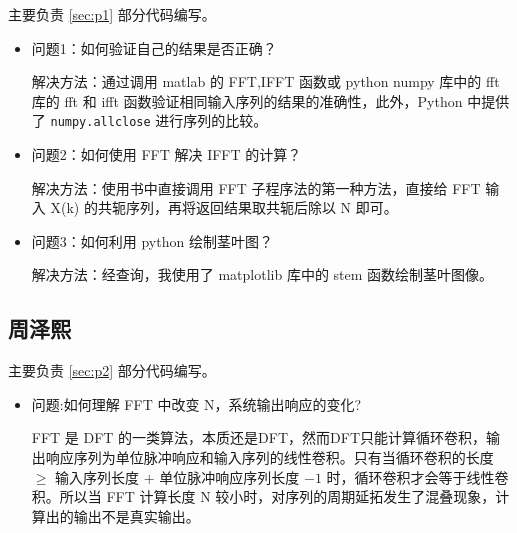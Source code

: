 \documentclass[12pt,AutoFakeBold]{article}
\begin{document}
主要负责 \ref{sec:p1} 部分代码编写。

\begin{itemize}
\item 问题1：如何验证自己的结果是否正确？

解决方法：通过调用 matlab 的 FFT,IFFT 函数或 python numpy 库中的 fft 库的 fft 和 ifft 函数验证相同输入序列的结果的准确性，此外，Python 中提供了 \lstinline[language=Python]|numpy.allclose| 进行序列的比较。
\item 问题2：如何使用 FFT 解决 IFFT 的计算？

解决方法：使用书中直接调用 FFT 子程序法的第一种方法，直接给 FFT 输入 X(k) 的共轭序列，再将返回结果取共轭后除以 N 即可。
\item 问题3：如何利用 python 绘制茎叶图？

解决方法：经查询，我使用了 matplotlib 库中的 stem 函数绘制茎叶图像。
\end{itemize}

\subsection{周泽熙}

主要负责 \ref{sec:p2} 部分代码编写。

\begin{itemize}
\item 问题:如何理解 FFT 中改变 N，系统输出响应的变化?

FFT 是 DFT 的一类算法，本质还是DFT，然而DFT只能计算循环卷积，输出响应序列为单位脉冲响应和输入序列的线性卷积。只有当循环卷积的长度 $\ge$ 输入序列长度 $+$ 单位脉冲响应序列长度 $-1$ 时，循环卷积才会等于线性卷积。所以当 FFT 计算长度 N 较小时，对序列的周期延拓发生了混叠现象，计算出的输出不是真实输出。
\end{itemize}



\end{document}
